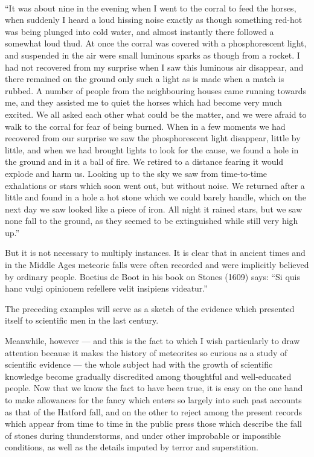 \documentclass[a4paper, 12pt, oneside]{article}
\begin{document}
\paragraph{}
``It was about nine in the evening when I went to the corral to feed the horses, when suddenly I heard a loud hissing noise exactly as though something red-hot was being plunged into cold water, and almost instantly there followed a somewhat loud thud. At once the corral was covered with a phosphorescent light, and suspended in the air were small luminous sparks as though from a rocket. I had not recovered from my surprise when I saw this luminous air disappear, and there remained on the ground only such a light as is made when a match is rubbed. A number of people from the neighbouring houses came running towards me, and they assisted me to quiet the horses which had become very much excited. We all asked each other what could be the matter, and we were afraid to walk to the corral for fear of being burned. When in a few moments we had recovered from our surprise we saw the phosphorescent light disappear, little by little, and when we had brought lights to look for the cause, we found a hole in the ground and in it a ball of fire. We retired to a distance fearing it would explode and harm us. Looking up to the sky we saw from time-to-time exhalations or stars which soon went out, but without noise. We returned after a little and found in a hole a hot stone which we could barely handle, which on the next day we saw looked like a piece of iron. All night it rained stars, but we saw none fall to the ground, as they seemed to be extinguished while still very high up.'' 

But it is not necessary to multiply instances. It is clear that in ancient times and in the Middle Ages meteoric falls were often recorded and were implicitly believed by ordinary people. Boetius de Boot in his book on Stones (1609) says: ``Si quis hanc vulgi opinionem refellere velit insipiens videatur.''

The preceding examples will serve as a sketch of the evidence which presented itself to scientific men in the last century. 

Meanwhile, however --- and this is the fact to which I wish particularly to draw attention because it makes the history of meteorites so curious as a study of scientific evidence --- the whole subject had with the growth of scientific knowledge become gradually discredited among thoughtful and well-educated people. Now that we know the fact to have been true, it is easy on the one hand to make allowances for the fancy which enters so largely into such past accounts as that of the Hatford fall, and on the other to reject among the present records which appear from time to time in the public press those which describe the fall of stones during thunderstorms, and under other improbable or impossible conditions, as well as the details imputed by terror and superstition. 
\end{document}
